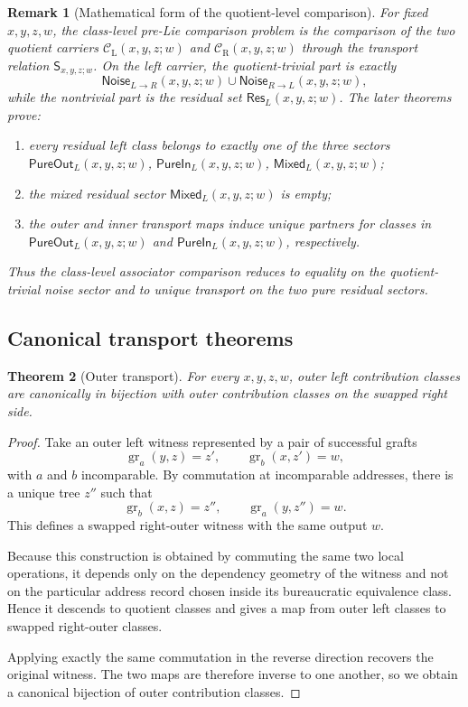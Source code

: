 \documentclass[11pt]{article}
\newtheorem{theorem}{Theorem}
\newtheorem{remark}[theorem]{Remark}
\newcommand{\CL}{\mathcal{C}_{\mathrm{L}}}
\newcommand{\CR}{\mathcal{C}_{\mathrm{R}}}
\newcommand{\Swap}{\mathsf{S}}
\newcommand{\Noise}{\mathsf{Noise}}
\newcommand{\Res}{\mathsf{Res}}
\newcommand{\PureOut}{\mathsf{PureOut}}
\newcommand{\PureIn}{\mathsf{PureIn}}
\newcommand{\graftat}[3]{\operatorname{gr}_{#2}(#3,#1)}
\begin{document}
\begin{remark}[Mathematical form of the quotient-level comparison]
For fixed \(x,y,z,w\), the class-level pre-Lie comparison problem is the
comparison of the two quotient carriers \(\CL(x,y,z;w)\) and
\(\CR(x,y,z;w)\) through the transport relation \(\Swap_{x,y,z;w}\). On the
left carrier, the quotient-trivial part is exactly
\[
\Noise_{L\to R}(x,y,z;w)\cup \Noise_{R\to L}(x,y,z;w),
\]
while the nontrivial part is the residual set \(\Res_L(x,y,z;w)\). The later
theorems prove:
\begin{enumerate}[label=\textup{(\roman*)}]
\item every residual left class belongs to exactly one of the three sectors
\(\PureOut_L(x,y,z;w)\), \(\PureIn_L(x,y,z;w)\), \(\mathsf{Mixed}_L(x,y,z;w)\);
\item the mixed residual sector \(\mathsf{Mixed}_L(x,y,z;w)\) is empty;
\item the outer and inner transport maps induce unique partners for classes in
\(\PureOut_L(x,y,z;w)\) and \(\PureIn_L(x,y,z;w)\), respectively.
\end{enumerate}
Thus the class-level associator comparison reduces to equality on the
quotient-trivial noise sector and to unique transport on the two pure residual
sectors.
\end{remark}

\subsection{Canonical transport theorems}

\begin{theorem}[Outer transport]
For every \(x,y,z,w\), outer left contribution classes are canonically in
bijection with outer contribution classes on the swapped right side.
\end{theorem}

\begin{proof}
Take an outer left witness represented by a pair of successful grafts
\[
\graftat{z}{a}{y}=z',
\qquad
\graftat{z'}{b}{x}=w,
\]
with \(a\) and \(b\) incomparable. By commutation at incomparable addresses,
there is a unique tree \(z''\) such that
\[
\graftat{z}{b}{x}=z'',
\qquad
\graftat{z''}{a}{y}=w.
\]
This defines a swapped right-outer witness with the same output \(w\).

Because this construction is obtained by commuting the same two local
operations, it depends only on the dependency geometry of the witness and not
on the particular address record chosen inside its bureaucratic equivalence
class. Hence it descends to quotient classes and gives a map from outer left
classes to swapped right-outer classes.

Applying exactly the same commutation in the reverse direction recovers the
original witness. The two maps are therefore inverse to one another, so we
obtain a canonical bijection of outer contribution classes.
\end{proof}
\end{document}
